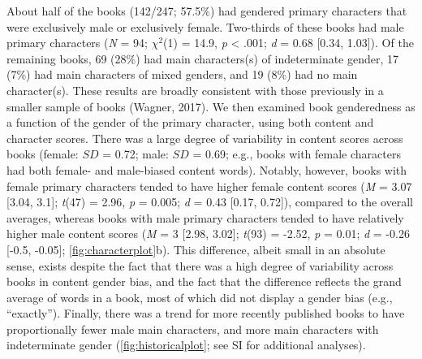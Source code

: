 \documentclass[
  english,
  ,man,floatsintext]{apa6}
\begin{document}
About half of the books (142/247; 57.5\%) had gendered primary characters that were exclusively male or exclusively female. Two-thirds of these books had male primary characters (\emph{N} = 94; \(\chi^2\)(1) = 14.9, \emph{p} \textless{} .001; \emph{d} = 0.68 {[}0.34, 1.03{]}). Of the remaining books, 69 (28\%) had main characters(s) of indeterminate gender, 17 (7\%) had main characters of mixed genders, and 19 (8\%) had no main character(s). These results are broadly consistent with those previously in a smaller sample of books (Wagner, 2017). We then examined book genderedness as a function of the gender of the primary character, using both content and character scores. There was a large degree of variability in content scores across books (female: \(SD\) = 0.72; male: \(SD\) = 0.69; e.g., books with female characters had both female- and male-biased content words). Notably, however, books with female primary characters tended to have higher female content scores (\emph{M} = 3.07 {[}3.04, 3.1{]}; \emph{t}(47) = 2.96, \emph{p} = 0.005; \emph{d} = 0.43 {[}0.17, 0.72{]}), compared to the overall averages, whereas books with male primary characters tended to have relatively higher male content scores (\emph{M} = 3 {[}2.98, 3.02{]}; \emph{t}(93) = -2.52, \emph{p} = 0.01; \emph{d} = -0.26 {[}-0.5, -0.05{]}; \autoref{fig:characterplot}b). This difference, albeit small in an absolute sense, exists despite the fact that there was a high degree of variability across books in content gender bias, and the fact that the difference reflects the grand average of words in a book, most of which did not display a gender bias (e.g., ``exactly''). Finally, there was a trend for more recently published books to have proportionally fewer male main characters, and more main characters with indeterminate gender (\autoref{fig:historicalplot}; see SI for additional analyses).
\end{document}
